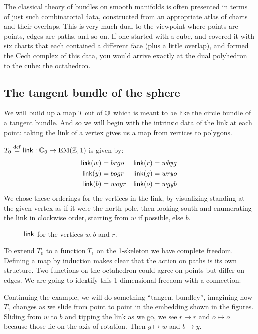 The classical theory of bundles on smooth manifolds is often presented in terms of just such combinatorial data, constructed from an appropriate atlas of charts and their overlaps. This is very much dual to the viewpoint where points are points, edges are paths, and so on. If one started with a cube, and covered it with six charts that each contained a different face (plus a little overlap), and formed the Cech complex of this data, you would arrive exactly at the dual polyhedron to the cube: the octahedron.

\subsection{The tangent bundle of the sphere}

We will build up a map \( T \) out of \( \mathbb{O} \) which is meant to be like the circle bundle of a tangent bundle. And so we will begin with the intrinsic data of the link at each point: taking the link of a vertex gives us a map from vertices to polygons.

\begin{mydef}
\( T_0\stackrel{\mathrm{def}}{=}\operatorname{\mathsf{link}}:\mathbb{O}_0\to\mathrm{EM}(\mathbb{Z},1) \) is given by:
\begin{align*}
\operatorname{\mathsf{link}}(w) &= brgo & \operatorname{\mathsf{link}}(r) &= wbyg \\
\operatorname{\mathsf{link}}(y) &= bogr & \operatorname{\mathsf{link}}(g) &= wryo \\
\operatorname{\mathsf{link}}(b) &= woyr & \operatorname{\mathsf{link}}(o) &= wgyb
\end{align*}
We chose these orderings for the vertices in the link, by visualizing standing at the given vertex as if it were the north pole, then looking south and enumerating the link in clockwise order, starting from \( w \) if possible, else \( b \).
\end{mydef}

\begin{figure}[h]
\centering

\caption{\( \operatorname{\mathsf{link}} \) for the vertices \( w, b\) and \( r \).}
\label{fig:triangle_of_equators}
\end{figure}

To extend \( T_0 \) to a function \( T_1 \) on the 1-skeleton we have complete freedom. Defining a map by induction makes clear that the action on paths is its own structure. Two functions on the octahedron could agree on points but differ on edges. We are going to identify this 1-dimensional freedom with a connection:

Continuing the example, we will do something ``tangent bundley'', imagining how \( T_1 \) changes as we slide from point to point in the embedding shown in the figures. Sliding from \( w \) to \( b \) and tipping the link as we go, we see \( r\mapsto r \) and \( o\mapsto o \) because those lie on the axis of rotation. Then \( g\mapsto w \) and \( b\mapsto y \). 

